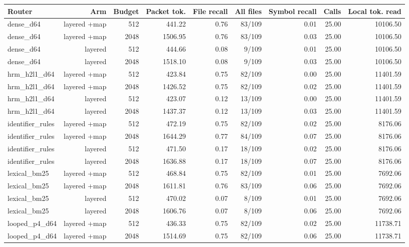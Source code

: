 \begin{table}[t]
\centering
\small
\begin{adjustbox}{max width=\linewidth}
\begin{tabular}{lrrrrrrrr}
\toprule
Router & Arm & Budget & Packet tok. & File recall & All files & Symbol recall & Calls & Local tok. read \\
\midrule
dense\_d64 & layered +map & 512 & 441.22 & 0.76 & 83/109 & 0.01 & 25.00 & 10106.50 \\
dense\_d64 & layered +map & 2048 & 1506.95 & 0.76 & 83/109 & 0.03 & 25.00 & 10106.50 \\
dense\_d64 & layered & 512 & 444.66 & 0.08 & 9/109 & 0.01 & 25.00 & 10106.50 \\
dense\_d64 & layered & 2048 & 1518.10 & 0.08 & 9/109 & 0.03 & 25.00 & 10106.50 \\
hrm\_h2l1\_d64 & layered +map & 512 & 423.84 & 0.75 & 82/109 & 0.00 & 25.00 & 11401.59 \\
hrm\_h2l1\_d64 & layered +map & 2048 & 1426.52 & 0.75 & 82/109 & 0.02 & 25.00 & 11401.59 \\
hrm\_h2l1\_d64 & layered & 512 & 423.07 & 0.12 & 13/109 & 0.00 & 25.00 & 11401.59 \\
hrm\_h2l1\_d64 & layered & 2048 & 1437.37 & 0.12 & 13/109 & 0.03 & 25.00 & 11401.59 \\
identifier\_rules & layered +map & 512 & 472.19 & 0.75 & 82/109 & 0.02 & 25.00 & 8176.06 \\
identifier\_rules & layered +map & 2048 & 1644.29 & 0.77 & 84/109 & 0.07 & 25.00 & 8176.06 \\
identifier\_rules & layered & 512 & 471.50 & 0.17 & 18/109 & 0.02 & 25.00 & 8176.06 \\
identifier\_rules & layered & 2048 & 1636.88 & 0.17 & 18/109 & 0.07 & 25.00 & 8176.06 \\
lexical\_bm25 & layered +map & 512 & 468.84 & 0.75 & 82/109 & 0.01 & 25.00 & 7692.06 \\
lexical\_bm25 & layered +map & 2048 & 1611.81 & 0.76 & 83/109 & 0.06 & 25.00 & 7692.06 \\
lexical\_bm25 & layered & 512 & 470.02 & 0.07 & 8/109 & 0.01 & 25.00 & 7692.06 \\
lexical\_bm25 & layered & 2048 & 1606.76 & 0.07 & 8/109 & 0.06 & 25.00 & 7692.06 \\
looped\_p4\_d64 & layered +map & 512 & 436.33 & 0.75 & 82/109 & 0.02 & 25.00 & 11738.71 \\
looped\_p4\_d64 & layered +map & 2048 & 1514.69 & 0.75 & 82/109 & 0.06 & 25.00 & 11738.71 \\

\end{tabular}
\end{adjustbox}
\end{table}

